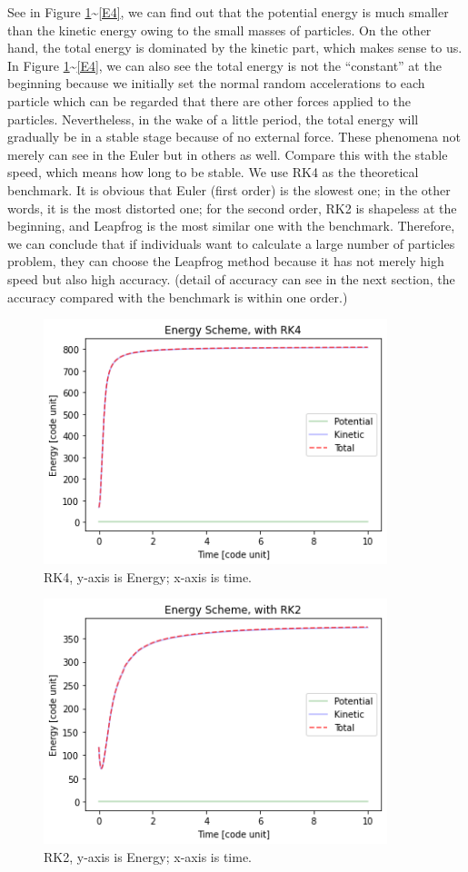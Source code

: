 \documentclass[12pt]{article}
\begin{document}
  See in Figure \ref{E1}\textasciitilde\ref{E4}, we can find out that the potential energy is much smaller than the kinetic energy owing to the small masses of particles. On the other hand, the total energy is dominated by the kinetic part, which makes sense to us. In Figure \ref{E1}\textasciitilde\ref{E4}, we can also see the total energy is not the ``constant'' at the beginning because we initially set the normal random accelerations to each particle which can be regarded that there are other forces applied to the particles. Nevertheless, in the wake of a little period, the total energy will gradually be in a stable stage because of no external force. These phenomena not merely can see in the Euler but in others as well. Compare this with the stable speed, which means how long to be stable. We use RK4 as the theoretical benchmark. It is obvious that Euler (first order) is the slowest one; in the other words, it is the most distorted one; for the second order, RK2 is shapeless at the beginning, and Leapfrog is the most similar one with the benchmark. Therefore, we can conclude that if individuals want to calculate a large number of particles problem, they can choose the Leapfrog method because it has not merely high speed but also high accuracy. (detail of accuracy can see in the next section, the accuracy compared with the benchmark is within one order.)

  \begin{figure}[H]
    \centering 
    \includegraphics[width = 10cm]{RK4_E.png}
    \caption{RK4, y-axis is Energy; x-axis is time.}
    \label{E1}
  \end{figure}

  \begin{figure}[H]
    \centering 
    \includegraphics[width = 10cm]{RK2_E.png}
    \caption{RK2, y-axis is Energy; x-axis is time.}
    \label{E2}
  \end{figure}
\end{document}
